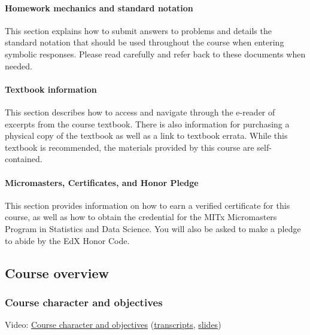 \documentclass[pdftex, brazil, 12pt, twoside]{article}
\begin{document}
\paragraph{Homework mechanics and standard notation}
This section explains how to submit answers to problems and details the standard
notation that should be used throughout the course when entering symbolic responses.
Please read carefully and refer back to these documents when needed.

\paragraph{Textbook information}
This section describes how to access and navigate through the e-reader of excerpts
from the course textbook. There is also information for purchasing a physical copy
of the textbook as well as a link to textbook errata. While this textbook is
recommended, the materials provided by this course are self-contained.

\paragraph{Micromasters, Certificates, and Honor Pledge}
This section provides information on how to earn a verified certificate for this
course, as well as how to obtain the credential for the MITx Micromasters Program
in Statistics and Data Science. You will also be asked to make a pledge to abide
by the EdX Honor Code.


\subsection{Course overview}
\label{ovw0-co}

\subsubsection{Course character and objectives}
\label{ovw0-co-objectives}

Video: \href{https://www.youtube.com/watch?v=OM3iEZGC2-k}{Course character and objectives}
(\href{Unit-0/Overview1\_transcripts.pdf}{transcripts}, \href{Unit-0/Overview1\_slides.pdf}{slides})

\end{document}
